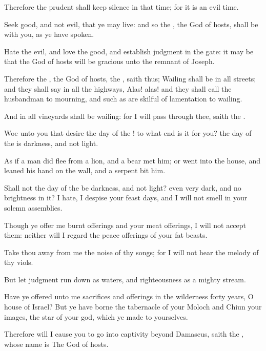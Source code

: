 \verse Therefore the prudent shall keep silence in that time; for it is an evil time.

\verse Seek good, and not evil, that ye may live: and so the \LORD, the God of hosts, shall be with you, as ye have spoken.

\verse Hate the evil, and love the good, and establish judgment in the gate: it may be that the \LORD God of hosts will be gracious unto the remnant of Joseph.

\verse Therefore the \LORD, the God of hosts, the \LORD, saith thus; Wailing shall be in all streets; and they shall say in all the highways, Alas! alas!  and they shall call the husbandman to mourning, and such as are skilful of lamentation to wailing.

\verse And in all vineyards shall be wailing: for I will pass through thee, saith the \LORD.

\verse Woe unto you that desire the day of the \LORD! to what end is it for you? the day of the \LORD is darkness, and not light.

\verse As if a man did flee from a lion, and a bear met him; or went into the house, and leaned his hand on the wall, and a serpent bit him.

\verse Shall not the day of the \LORD be darkness, and not light? even very dark, and no brightness in it?  \verse I hate, I despise your feast days, and I will not smell in your solemn assemblies.

\verse Though ye offer me burnt offerings and your meat offerings, I will not accept them: neither will I regard the peace offerings of your fat beasts.

\verse Take thou away from me the noise of thy songs; for I will not hear the melody of thy viols.

\verse But let judgment run down as waters, and righteousness as a mighty stream.

\verse Have ye offered unto me sacrifices and offerings in the wilderness forty years, O house of Israel?  \verse But ye have borne the tabernacle of your Moloch and Chiun your images, the star of your god, which ye made to yourselves.

\verse Therefore will I cause you to go into captivity beyond Damascus, saith the \LORD, whose name is The God of hosts.


